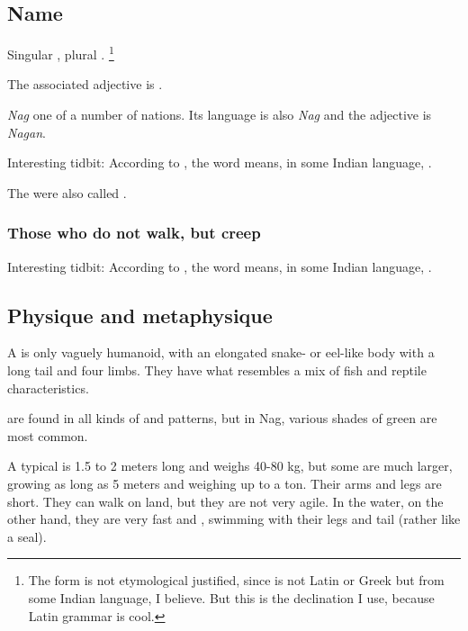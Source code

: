 \subsection{Name}
Singular \emph{\naga{}}, plural \emph{\nagae{}}.%
\footnote{%
  The form \quo{\nagae} is not etymological justified, since \quo{\naga} is not Latin or Greek but from some Indian language, I believe. But this is the declination I use, because Latin grammar is cool.} 

The associated adjective is \emph{\naga{}}. 

\emph{Nag} one of a number of \naga{} nations. 
Its language is also \emph{Nag} and the adjective is \emph{Nagan}. 

Interesting tidbit: 
According to \DIBiggestSecret, the word  means, in some Indian language, . 

The \nagae were also called \quo{\ichthyans}. 





\subsubsection{Those who do not walk, but creep}
Interesting tidbit: 
According to \DIBiggestSecret, the word  means, in some Indian language, . 









\subsection{Physique and metaphysique}
A \naga{} is only vaguely humanoid, with an elongated snake- or eel-like body with a long tail and four limbs. 
They have what resembles a mix of fish and reptile characteristics. 

\Nagae{} are found in all kinds of \colours and patterns, but in Nag, various shades of green are most common. 

A typical \naga{} is 1.5 to 2 meters long and weighs 40-80 kg, but some are much larger, growing as long as 5 meters and weighing up to a ton. 
Their arms and legs are short. 
They can walk on land, but they are not very agile. 
In the water, on the other hand, they are very fast and \manoeuvrable, swimming with their legs and tail (rather like a seal). 


